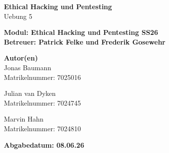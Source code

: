 \documentclass[12pt,a4paper]{article}
\begin{document}
\begin{titlepage}
\centering

\vspace{2cm}

{\Huge \textbf{Ethical Hacking und Pentesting}}\\[0.5cm]
{\LARGE Uebung 5}

\vspace{2cm}

\textbf{Modul: Ethical Hacking und Pentesting SS26} \\
\textbf{Betreuer: Patrick Felke und Frederik Gosewehr} 

\vspace{3cm}

\textbf{Autor(en)}\\
Jonas Baumann \\
Matrikelnummer: 7025016

\vspace{0.5cm}

Julian van Dyken \\
Matrikelnummer: 7024745

\vspace{0.5cm}

Marvin Hahn \\
Matrikelnummer: 7024810

\vspace{3cm}

\textbf{Abgabedatum: 08.06.26} 

\end{titlepage}


\tableofcontents
\newpage









\printbibliography
\end{document}
